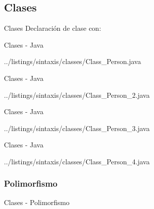 	\subsection{Clases} %
		 
		\begin{frame}[fragile]{Clases}	
			Declaración de clase con:
			\begin{itemize}
			\end{itemize}
			
		\end{frame}
		
		\begin{frame}[fragile]{Clases - Java}	
			
				{../listings/sintaxis/classes/Class_Person.java}
		\end{frame}
		
		\begin{frame}[fragile]{Clases - Java}	
			
				{../listings/sintaxis/classes/Class_Person_2.java}
		\end{frame}
		
		\begin{frame}[fragile]{Clases - Java}	
			
				{../listings/sintaxis/classes/Class_Person_3.java}
		\end{frame}
		
		\begin{frame}[fragile]{Clases - Java}	
			
				{../listings/sintaxis/classes/Class_Person_4.java}
		\end{frame}
		
		\subsubsection{Polimorfismo} %
		
			\begin{frame}[fragile]{Clases - Polimorfismo}	
				
			\end{frame}
			

